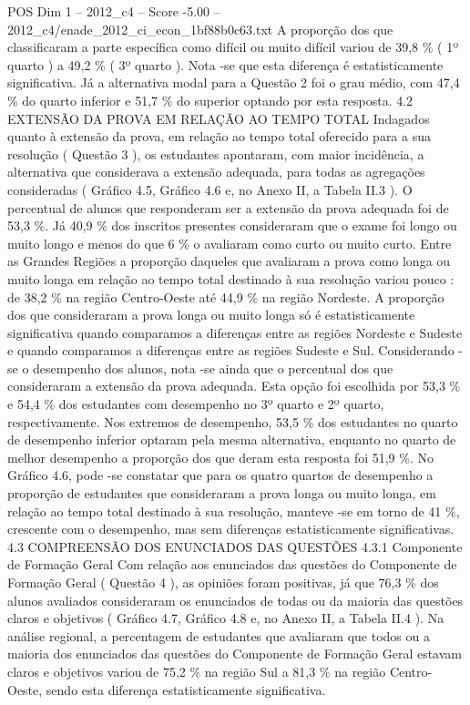 \begin{textsample}{POS Dim 1 – 2012\_c4 – Score -5.00 – 2012\_c4/enade\_2012\_ci\_econ\_1bf88b0c63.txt}
A proporção dos que classificaram a parte específica como difícil ou muito difícil variou de 39,8 \% ( 1º quarto ) a 49,2 \% ( 3º quarto ).
Nota -se que esta diferença é estatisticamente significativa.
Já a alternativa modal para a Questão 2 foi o grau médio, com 47,4 \% do quarto inferior e 51,7 \% do superior optando por esta resposta. 4.2 EXTENSÃO DA PROVA EM RELAÇÃO AO TEMPO TOTAL Indagados quanto à extensão da prova, em relação ao tempo total oferecido para a sua resolução ( Questão 3 ), os estudantes apontaram, com maior incidência, a alternativa que considerava a extensão adequada, para todas as agregações consideradas ( Gráfico 4.5, Gráfico 4.6 e, no Anexo II, a Tabela II.3 ).
O percentual de alunos que responderam ser a extensão da prova adequada foi de 53,3 \%.
Já 40,9 \% dos inscritos presentes consideraram que o exame foi longo ou muito longo e menos do que 6 \% o avaliaram como curto ou muito curto.
Entre as Grandes Regiões a proporção daqueles que avaliaram a prova como longa ou muito longa em relação ao tempo total destinado à sua resolução variou pouco : de 38,2 \% na região Centro-Oeste até 44,9 \% na região Nordeste.
A proporção dos que consideraram a prova longa ou muito longa só é estatisticamente significativa quando comparamos a diferenças entre as regiões Nordeste e Sudeste e quando comparamos a diferenças entre as regiões Sudeste e Sul.
Considerando -se o desempenho dos alunos, nota -se ainda que o percentual dos que consideraram a extensão da prova adequada.
Esta opção foi escolhida por 53,3 \% e 54,4 \% dos estudantes com desempenho no 3º quarto e 2º quarto, respectivamente.
Nos extremos de desempenho, 53,5 \% dos estudantes no quarto de desempenho inferior optaram pela mesma alternativa, enquanto no quarto de melhor desempenho a proporção dos que deram esta resposta foi 51,9 \%.
No Gráfico 4.6, pode -se constatar que para os quatro quartos de desempenho a proporção de estudantes que consideraram a prova longa ou muito longa, em relação ao tempo total destinado à sua resolução, manteve -se em torno de 41 \%, crescente com o desempenho, mas sem diferenças estatisticamente significativas. 4.3 COMPREENSÃO DOS ENUNCIADOS DAS QUESTÕES 4.3.1 Componente de Formação Geral Com relação aos enunciados das questões do Componente de Formação Geral ( Questão 4 ), as opiniões foram positivas, já que 76,3 \% dos alunos avaliados consideraram os enunciados de todas ou da maioria das questões claros e objetivos ( Gráfico 4.7, Gráfico 4.8 e, no Anexo II, a Tabela II.4 ).
Na análise regional, a percentagem de estudantes que avaliaram que todos ou a maioria dos enunciados das questões do Componente de Formação Geral estavam claros e objetivos variou de 75,2 \% na região Sul a 81,3 \% na região Centro-Oeste, sendo esta diferença estatisticamente significativa.

\end{textsample}
